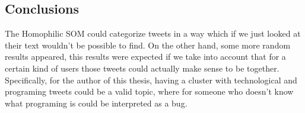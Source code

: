 \subsection{Conclusions}
The Homophilic \ac{SOM} could categorize tweets in a way which if we just looked at their text wouldn't  be possible to find. On the other hand, some more random results appeared, this results were expected if we take into account that for a certain kind of users those tweets could actually make sense to be together. Specifically, for the author of this thesis, having a cluster with technological and programing tweets could be a valid topic, where for someone who doesn't know what programing is could be interpreted as a bug.
\cleardoublepage



 

